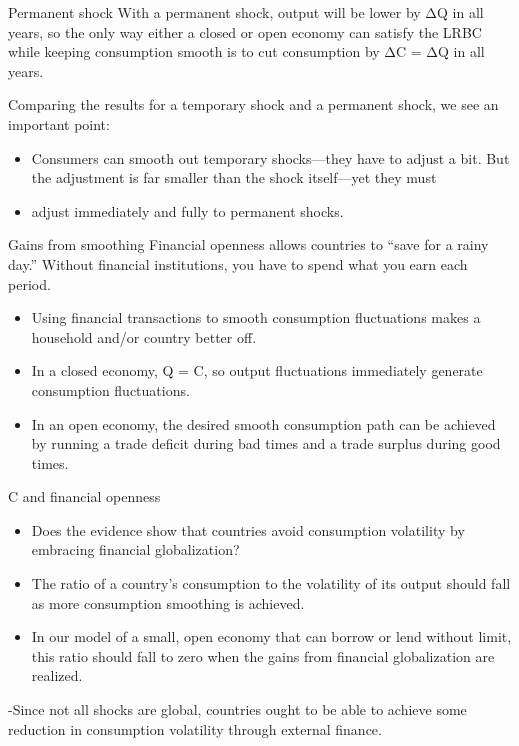 \documentclass[
  ignorenonframetext,
]{beamer}
\providecommand{\tightlist}{%
  \setlength{\itemsep}{0pt}\setlength{\parskip}{0pt}}\usepackage{longtable,booktabs,array}
\begin{document}
\begin{frame}{Permanent shock}
\label{permanent-shock}
With a permanent shock, output will be lower by ΔQ in all years, so the
only way either a closed or open economy can satisfy the LRBC while
keeping consumption smooth is to cut consumption by ΔC = ΔQ in all
years.

Comparing the results for a temporary shock and a permanent shock, we
see an important point:

\begin{itemize}
\item
  Consumers can smooth out temporary shocks---they have to adjust a bit.
  But the adjustment is far smaller than the shock itself---yet they
  must
\item
  adjust immediately and fully to permanent shocks.
\end{itemize}
\end{frame}

\begin{frame}{Gains from smoothing}
\label{gains-from-smoothing}
Financial openness allows countries to ``save for a rainy day.'' Without
financial institutions, you have to spend what you earn each period.

\begin{itemize}
\tightlist
\item
  Using financial transactions to smooth consumption fluctuations makes
  a household and/or country better off.
\item
  In a closed economy, Q = C, so output fluctuations immediately
  generate consumption fluctuations.
\item
  In an open economy, the desired smooth consumption path can be
  achieved by running a trade deficit during bad times and a trade
  surplus during good times.
\end{itemize}
\end{frame}

\begin{frame}{C and financial openness}
\label{c-and-financial-openness}
\begin{itemize}
\item
  Does the evidence show that countries avoid consumption volatility by
  embracing financial globalization?
\item
  The ratio of a country's consumption to the volatility of its output
  should fall as more consumption smoothing is achieved.
\item
  In our model of a small, open economy that can borrow or lend without
  limit, this ratio should fall to zero when the gains from financial
  globalization are realized.
\end{itemize}

-Since not all shocks are global, countries ought to be able to achieve
some reduction in consumption volatility through external finance.
\end{frame}
\end{document}
